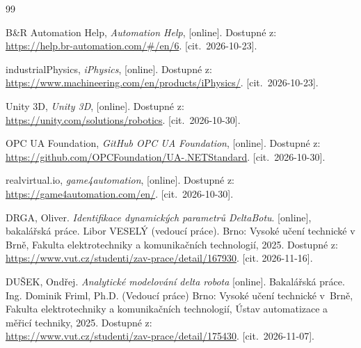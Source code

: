 

\begin{thebibliography}{99}

	B\&R Automation Help,
	\emph{Automation Help},
	[online].
	Dostupné z:\\
	\url{https://help.br-automation.com/#/en/6}.
	[cit.\ 2026-10-23].


	industrialPhysics,
	\emph{iPhysics},
	[online].
	Dostupné z:\\
	\url{https://www.machineering.com/en/products/iPhysics/}.
	[cit.\ 2026-10-23].

	Unity 3D, \emph{Unity 3D}, [online].
	Dostupné z:\\
	\url{https://unity.com/solutions/robotics}.
	[cit.\ 2026-10-30].

	OPC UA Foundation, \emph{GitHub OPC UA Foundation}, [online].
	Dostupné z:\\
	\url{https://github.com/OPCFoundation/UA-.NETStandard}.
	[cit.\ 2026-10-30].	

	realvirtual.io, \emph{game4automation}, [online].
	Dostupné z:\\
	\url{https://game4automation.com/en/}.
	[cit.\ 2026-10-30].	

	DRGA, Oliver. \emph{Identifikace dynamických parametrů DeltaBotu}.
	[online], bakalářská práce. Libor VESELÝ (vedoucí práce).
	Brno: Vysoké učení technické v Brně, Fakulta elektrotechniky a 
	komunikačních technologií, 2025. Dostupné z:
	\url{https://www.vut.cz/studenti/zav-prace/detail/167930}.
	[cit. 2026-11-16].

	DUŠEK, Ondřej. \emph{Analytické modelování delta robota} [online].
	Bakalářská práce.
	Ing. Dominik Friml, Ph.D. (Vedoucí práce) Brno: Vysoké učení technické v~Brně,
	Fakulta elektrotechniky a komunikačních technologií, Ústav automatizace a měřicí
	techniky, 2025.	Dostupné z:\\
	\url{https://www.vut.cz/studenti/zav-prace/detail/175430}.
	[cit.\ 2026-11-07].	
	



\end{thebibliography}
